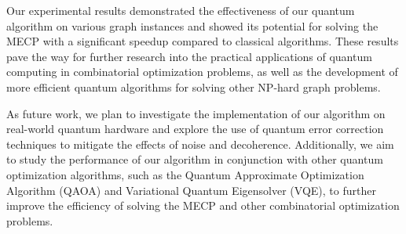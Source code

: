 Our experimental results demonstrated the effectiveness of our quantum algorithm on various graph instances and showed its potential for solving the MECP with a significant speedup compared to classical algorithms. These results pave the way for further research into the practical applications of quantum computing in combinatorial optimization problems, as well as the development of more efficient quantum algorithms for solving other NP-hard graph problems.

As future work, we plan to investigate the implementation of our algorithm on real-world quantum hardware and explore the use of quantum error correction techniques to mitigate the effects of noise and decoherence. Additionally, we aim to study the performance of our algorithm in conjunction with other quantum optimization algorithms, such as the Quantum Approximate Optimization Algorithm (QAOA) and Variational Quantum Eigensolver (VQE), to further improve the efficiency of solving the MECP and other combinatorial optimization problems.

